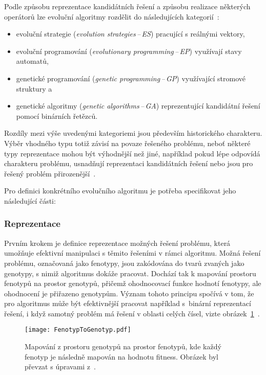 Podle způsobu reprezentace kandidátních řešení a způsobu realizace některých operátorů lze evoluční algoritmy rozdělit do následujících kategorií~\cite{IntroductionToEvoComputing}:
\begin{itemize}
    \item evoluční strategie (\emph{evolution strategies\,--\,ES}) pracující s reálnými vektory,
    \item evoluční programování (\emph{evolutionary programming\,--\,EP}) využívají stavy automatů,
    \item genetické programování (\emph{genetic programming\,--\,GP}) využívající stromové struktury a
    \item genetické algoritmy (\emph{genetic algorithms\,--\,GA}) reprezentující kandidátní řešení pomocí binárních řetězců. 
\end{itemize}
Rozdíly mezi výše uvedenými kategoriemi jsou především historického charakteru. 
Výběr vhodného typu totiž závisí na povaze řešeného problému, neboť některé typy reprezentace mohou být výhodnější než jiné, například pokud lépe odpovídá charakteru problému, usnadňují reprezentaci kandidátních řešení nebo jsou pro řešený problém přirozenější~\cite{IntroductionToEvoComputing}. 

Pro definici konkrétního evolučního algoritmu je potřeba specifikovat jeho následující části:

\subsubsection*{Reprezentace}
Prvním krokem je definice reprezentace možných řešení problému, která umožňuje efektivní manipulaci s těmito řešeními v rámci algoritmu. 
Možná řešení problému, označovaná jako fenotypy, jsou zakódována do tvarů zvaných jako genotypy, s nimiž algoritmus dokáže pracovat. 
Dochází tak k mapování prostoru fenotypů na prostor genotypů, přičemž ohodnocovací funkce hodnotí fenotypy, ale ohodnocení je přiřazeno genotypům. 
Význam tohoto principu spočívá v tom, že pro algoritmus může být efektivnější pracovat například s~binární reprezentací řešení, i když samotný problém má řešení v oblasti celých čísel, vizte obrázek~\ref{fig:fenotyp-to-genotyp}~\cite{IntroductionToEvoComputing,NaturalComputing}. 
\begin{figure}[ht!]
    \centering
    \texttt{[image: FenotypToGenotyp.pdf]}
    \caption{Mapování z prostoru genotypů na prostor fenotypů, kde každý fenotyp je následně mapován na hodnotu fitness. Obrázek byl převzat s úpravami z~\cite{NaturalComputing}.}
    \label{fig:fenotyp-to-genotyp}
\end{figure}

